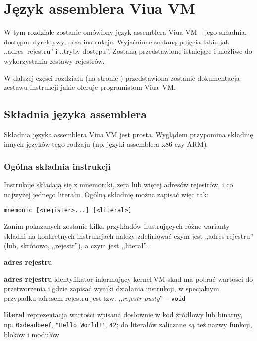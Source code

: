 \chapter{Język assemblera Viua VM}
\label{appendix_viua_vm_assembly_language}

W tym rozdziale zostanie omówiony język assemblera Viua VM -- jego składnia,
dostępne dyrektywy, oraz instrukcje. Wyjaśnione zostaną pojęcia takie jak
,,adres~rejestru'' i ,,tryby dostępu''. Zostaną przedstawione istniejące i
możliwe do wykorzystania zestawy rejestrów.

W dalszej części rozdziału (na stronie \pageref{appendix_viua_vm_assembly_language_ops})
przedstawiona zostanie dokumentacja zestawu instrukcji jakie oferuje
programistom Viua~VM.

\section{Składnia języka assemblera}

Składnia języka assemblera Viua VM jest prosta. Wyglądem przypomina składnię innych języków tego rodzaju
(np. języki assemblera x86 czy ARM).

\subsection{Ogólna składnia instrukcji}

Instrukcje składają się z mnemoniki, zera lub więcej adresów rejestrów, i co najwyżej jednego literału. Ogólną składnię można zapisać więc tak:

\begin{lstlisting}
mnemonic [<register>...] [<literal>]
\end{lstlisting}

Zanim pokazanych zostanie kilka przykładów ilustrujących różne warianty składni na konkretnych instrukcjach
należy zdefiniować czym jest ,,adres rejestru'' (lub, skrótowo, ,,rejestr''), a czym jest ,,literał''.

\begin{labeling}{\textbf{adres rejestru}}
	\item[\textbf{adres rejestru}] identyfikator informujący kernel VM skąd ma pobrać wartości do
		przetworzenia i gdzie zapisać wyniki działania instrukcji, w specjalnym przypadku adresem rejestru
		jest tzw. ,,\emph{rejestr pusty}'' -- \texttt{void}
	\item[\textbf{literał}] reprezentacja wartości wpisana dosłownie w kod źródłowy lub binarny,
		np. \texttt{0xdeadbeef}, \texttt{"Hello World!"}, \texttt{42}; do literałów zaliczane są też nazwy
		funkcji, bloków i modułów
\end{labeling}


